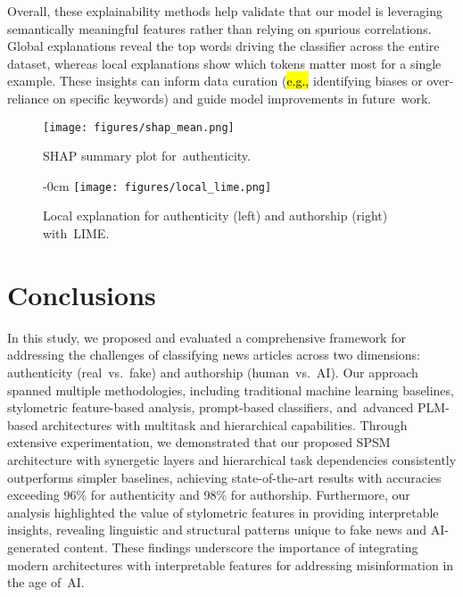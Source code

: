 \documentclass[electronics,article,accept,pdftex,moreauthors,electronics]{Definitions/mdpi}
\begin{document}
Overall, these explainability methods help validate that our model is leveraging semantically meaningful features rather than relying on spurious correlations. Global explanations reveal the top words driving the classifier across the entire dataset, whereas local explanations show which tokens matter most for a single example. These insights can inform data curation (\hl{e.g.,} identifying biases or over-reliance on specific keywords) and guide model improvements in future~work.


\begin{figure}[H] %
    \texttt{[image: figures/shap\_mean.png]}\vspace{-4pt}
    \caption{SHAP summary plot for~authenticity.}
    \label{fig:shap-summary}
\end{figure}
\vspace{-6pt}


\begin{figure}[H]
\begin{adjustwidth}{-\extralength}{0cm}
\centering
    \texttt{[image: figures/local\_lime.png]}
\end{adjustwidth}
    \caption{Local explanation for authenticity (left) and authorship (right) with~LIME.}
    \label{fig:local-lime}
\end{figure}




\section{Conclusions}\label{S8}

In this study, we proposed and evaluated a comprehensive framework for addressing the challenges of classifying news articles across two dimensions: authenticity (real~vs.~fake) and authorship (human~vs.~AI). Our approach spanned multiple methodologies, including traditional machine learning baselines, stylometric feature-based analysis, prompt-based classifiers, and~advanced PLM-based architectures with multitask and hierarchical capabilities. Through extensive experimentation, we demonstrated that our proposed SPSM architecture with synergetic layers and hierarchical task dependencies consistently outperforms simpler baselines, achieving state-of-the-art results with accuracies exceeding 96\% for authenticity and 98\% for authorship. Furthermore, our analysis highlighted the value of stylometric features in providing interpretable insights, revealing linguistic and structural patterns unique to fake news and AI-generated content. These findings underscore the importance of integrating modern architectures with interpretable features for addressing misinformation in the age of~AI.
\end{document}
